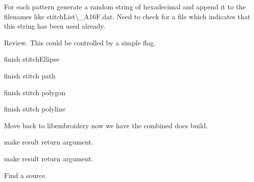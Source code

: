 \begin{DoxyRefList}
\label{todo__todo000005}%
%
For each pattern generate a random string of hexadecimal and append it to the filenames like {\ttfamily stitch\+List\textbackslash{}\+\_\+\+A16\+F.\+dat}. Need to check for a file which indicates that this string has been used already. 
\item[Global \mbox{\hyperlink{geometry_8c_ae6461f57f08ce5992c70fa9897988644}{emb\+Geometry\+\_\+vulcanize}} (Emb\+Geometry $\ast$obj)]\label{todo__todo000028}%
%
Review. This could be controlled by a simple flag.  
\item[Global \mbox{\hyperlink{fill_8c_a63bc84e4406e59c092a2e076afedf930}{emb\+Pattern\+\_\+stitch\+Ellipse}} (Emb\+Pattern $\ast$p, Emb\+Ellipse ellipse, int thread\+\_\+index, int style)]\label{todo__todo000014}%
%
finish stitch\+Ellipse  
\item[Global \mbox{\hyperlink{fill_8c_a736fce5df010bbe74ea9ad2857be9bf4}{emb\+Pattern\+\_\+stitch\+Path}} (Emb\+Pattern $\ast$p, Emb\+Path path, int thread\+\_\+index, int style)]\label{todo__todo000015}%
%
finish stitch path  
\item[Global \mbox{\hyperlink{fill_8c_a86f903495c0da7514294200680bd6414}{emb\+Pattern\+\_\+stitch\+Polygon}} (Emb\+Pattern $\ast$p, Emb\+Polygon polygon, int thread\+\_\+index, int style)]\label{todo__todo000016}%
%
finish stitch polygon  
\item[Global \mbox{\hyperlink{fill_8c_a9ae9d5d7dfbb2ab361dc37970b7eb2f2}{emb\+Pattern\+\_\+stitch\+Polyline}} (Emb\+Pattern $\ast$p, Emb\+Polyline polyline, int thread\+\_\+index, int style)]\label{todo__todo000017}%
%
finish stitch polyline  
\item[Page \mbox{\hyperlink{md_embroidermodder2_extern_libembroidery_src_embroider_cli}{embroider\+\_\+cli}} ]\label{todo__todo000006}%
%
Move back to libembroidery now we have the combined docs build. 
\item[Global \mbox{\hyperlink{vector_8c_a0a4af07bfac410623cf77a35a11550b1}{emb\+Vector\+\_\+multiply}} (Emb\+Vector vector, Emb\+Real magnitude, Emb\+Vector $\ast$result)]\label{todo__todo000039}%
%
make result return argument.  
\item[Global \mbox{\hyperlink{vector_8c_aaad72d90c58592e330de08139aee5077}{emb\+Vector\+\_\+normalize}} (Emb\+Vector vector, Emb\+Vector $\ast$result)]\label{todo__todo000038}%
%
make result return argument.  
\item[Page \mbox{\hyperlink{md_embroidermodder2_extern_libembroidery_src_formats_formats}{Formats}} ]\label{todo__todo000042}%
%
Find a source.


\end{DoxyRefList}
